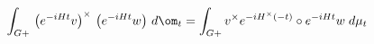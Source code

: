 \begin{equation}
\int_{G+} \, \left( e^{-iHt} v\right)^\times\, \left( e^{-iHt} w\right) \,
		 d\om_t 
		=\int_{G+}  v^\times e^{-iH^\times (-t)}\circ e^{-iHt} w\; 
			d \mu_t
\label{eq:ftnorm}
\end{equation}

